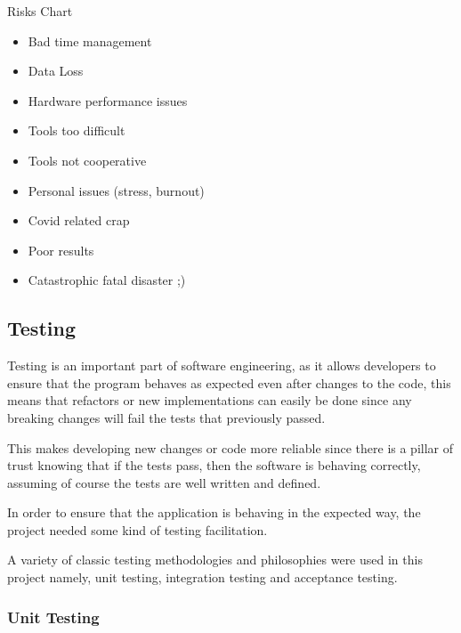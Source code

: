 \documentclass[12pt]{article}
\newcommand{\sentence}{} %
\begin{document}
    \pagebreak
    \thispagestyle{empty}
    \begin{landscape}
        \begin{center}
            \huge{Risks Chart}
            \normalsize
            \begin{itemize}
                \item Bad time management
                \item Data Loss
                \item Hardware performance issues
                \item Tools too difficult
                \item Tools not cooperative
                \item Personal issues (stress, burnout)
                \item Covid related crap
                \item Poor results
                \item Catastrophic fatal disaster ;)
            \end{itemize}
        \end{center}
    \end{landscape}
    \pagebreak

    \subsection{Testing}\label{subsec:testing}

    \tab
    Testing is an important part of software engineering, as it allows developers to ensure that the program behaves
    as expected even after changes to the code, this means that refactors or new implementations can easily be done
    since any breaking changes will fail the tests that previously passed.
    \sentence
    This makes developing new changes or code more reliable since there is a pillar of trust knowing that if the
    tests pass, then the software is behaving correctly, assuming of course the tests are well written and defined.
    \sentence
    In order to ensure that the application is behaving in the expected way, the project needed some kind of
    testing facilitation.
    \sentence
    A variety of classic testing methodologies and philosophies were used in this project namely, unit testing,
    integration testing and acceptance testing.

    \subsubsection{Unit Testing}\label{subsubsec:unit-testing}
\end{document}
